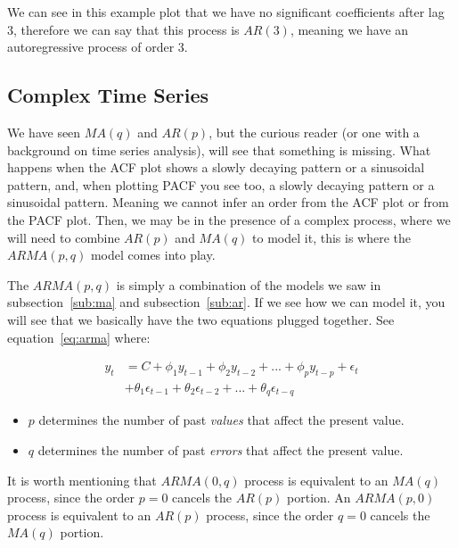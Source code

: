 \documentclass[journal]{IEEEtran}
\begin{document}
We can see in this example plot that we have no significant coefficients after
lag 3, therefore we can say that this process is $AR(3)$, meaning we have an
autoregressive process of order 3.

\subsection{Complex Time Series}

We have seen $MA(q)$ and $AR(p)$, but the curious reader (or one with a
background on time series analysis), will see that something is missing.  What
happens when the ACF plot shows a slowly decaying pattern or a sinusoidal
pattern, and, when plotting PACF you see too, a slowly decaying pattern or a
sinusoidal pattern. Meaning we cannot infer an order from the ACF plot or from
the PACF plot. Then, we may be in the presence of a complex process, where we
will need to combine $AR(p)$ and $MA(q)$ to model it, this is where the
$ARMA(p, q)$ model comes into play.

The $ARMA(p, q)$  is simply a combination of the models we saw in
subsection~\ref{sub:ma} and subsection~\ref{sub:ar}. If we see how we can
model it, you will see that we basically have the two equations plugged
together. See equation~\ref{eq:arma} where:

\begin{equation}
\begin{aligned}
    y_t &= C + \phi_1 y_{t-1} + \phi_2 y_{t-2} +
            ... +  \phi_p y_{t-p} + \epsilon_t \\
        &+ \theta_1\epsilon_{t-1} + \theta_2\epsilon_{t-2} +
            ... +  \theta_q\epsilon_{t-q}
    \label{eq:arma}
\end{aligned}
\end{equation}

\begin{itemize}
    \item $p$ determines the number of past \emph{values} that affect the present
        value.
    \item $q$ determines the number of past \emph{errors} that affect the
        present value.
\end{itemize}

It is worth mentioning that $ARMA(0,q)$ process is equivalent to an $MA(q)$
process, since the order $p = 0$ cancels the $AR(p)$ portion. An $ARMA(p,0)$
process is equivalent to an $AR(p)$ process, since the order $q = 0$ cancels
the $MA(q)$ portion.
\end{document}
